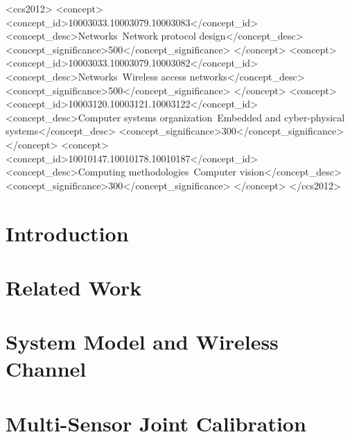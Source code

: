\documentclass[sigconf, 10pt, review, anonymous]{acmart}
\begin{document}
\begin{CCSXML}
<ccs2012>
 <concept>
  <concept_id>10003033.10003079.10003083</concept_id>
  <concept_desc>Networks~Network protocol design</concept_desc>
  <concept_significance>500</concept_significance>
 </concept>
 <concept>
  <concept_id>10003033.10003079.10003082</concept_id>
  <concept_desc>Networks~Wireless access networks</concept_desc>
  <concept_significance>500</concept_significance>
 </concept>
 <concept>
  <concept_id>10003120.10003121.10003122</concept_id>
  <concept_desc>Computer systems organization~Embedded and cyber-physical systems</concept_desc>
  <concept_significance>300</concept_significance>
 </concept>
 <concept>
  <concept_id>10010147.10010178.10010187</concept_id>
  <concept_desc>Computing methodologies~Computer vision</concept_desc>
  <concept_significance>300</concept_significance>
 </concept>
</ccs2012>
\end{CCSXML}



\maketitle

\section{Introduction}


\section{Related Work}


\section{System Model and Wireless Channel}


\section{Multi-Sensor Joint Calibration}

\end{document}

